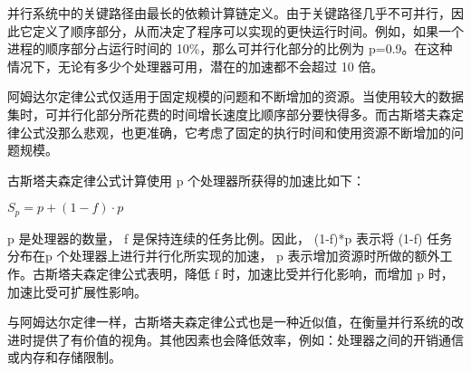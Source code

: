 
并行系统中的关键路径由最长的依赖计算链定义。由于关键路径几乎不可并行，因此它定义了顺序部分，从而决定了程序可以实现的更快运行时间。例如，如果一个进程的顺序部分占运行时间的 10\%，那么可并行化部分的比例为 p=0.9。在这种情况下，无论有多少个处理器可用，潜在的加速都不会超过 10 倍。


阿姆达尔定律公式仅适用于固定规模的问题和不断增加的资源。当使用较大的数据集时，可并行化部分所花费的时间增长速度比顺序部分要快得多。而古斯塔夫森定律公式没那么悲观，也更准确，它考虑了固定的执行时间和使用资源不断增加的问题规模。

古斯塔夫森定律公式计算使用 p 个处理器所获得的加速比如下：

\begin{center}
$S_p = p + (1 - f) · p$
\end{center}

p 是处理器的数量， f 是保持连续的任务比例。因此， (1-f)*p 表示将 (1-f) 任务分布在p 个处理器上进行并行化所实现的加速， p 表示增加资源时所做的额外工作。古斯塔夫森定律公式表明，降低 f 时，加速比受并行化影响，而增加 p 时，加速比受可扩展性影响。

与阿姆达尔定律一样，古斯塔夫森定律公式也是一种近似值，在衡量并行系统的改进时提供了有价值的视角。其他因素也会降低效率，例如：处理器之间的开销通信或内存和存储限制。




































